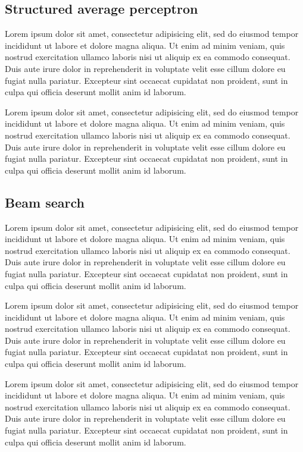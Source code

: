 \documentclass[11pt,letterpaper]{article}
\begin{document}
\subsection{Structured average perceptron}

Lorem ipsum dolor sit amet, consectetur adipisicing elit, sed do eiusmod tempor incididunt ut labore et dolore magna aliqua. Ut enim ad minim veniam, quis nostrud exercitation ullamco laboris nisi ut aliquip ex ea commodo consequat. Duis aute irure dolor in reprehenderit in voluptate velit esse cillum dolore eu fugiat nulla pariatur. Excepteur sint occaecat cupidatat non proident, sunt in culpa qui officia deserunt mollit anim id laborum.


Lorem ipsum dolor sit amet, consectetur adipisicing elit, sed do eiusmod tempor incididunt ut labore et dolore magna aliqua. Ut enim ad minim veniam, quis nostrud exercitation ullamco laboris nisi ut aliquip ex ea commodo consequat. Duis aute irure dolor in reprehenderit in voluptate velit esse cillum dolore eu fugiat nulla pariatur. Excepteur sint occaecat cupidatat non proident, sunt in culpa qui officia deserunt mollit anim id laborum.

\subsection{Beam search}

Lorem ipsum dolor sit amet, consectetur adipisicing elit, sed do eiusmod tempor incididunt ut labore et dolore magna aliqua. Ut enim ad minim veniam, quis nostrud exercitation ullamco laboris nisi ut aliquip ex ea commodo consequat. Duis aute irure dolor in reprehenderit in voluptate velit esse cillum dolore eu fugiat nulla pariatur. Excepteur sint occaecat cupidatat non proident, sunt in culpa qui officia deserunt mollit anim id laborum.

Lorem ipsum dolor sit amet, consectetur adipisicing elit, sed do eiusmod tempor incididunt ut labore et dolore magna aliqua. Ut enim ad minim veniam, quis nostrud exercitation ullamco laboris nisi ut aliquip ex ea commodo consequat. Duis aute irure dolor in reprehenderit in voluptate velit esse cillum dolore eu fugiat nulla pariatur. Excepteur sint occaecat cupidatat non proident, sunt in culpa qui officia deserunt mollit anim id laborum.

Lorem ipsum dolor sit amet, consectetur adipisicing elit, sed do eiusmod tempor incididunt ut labore et dolore magna aliqua. Ut enim ad minim veniam, quis nostrud exercitation ullamco laboris nisi ut aliquip ex ea commodo consequat. Duis aute irure dolor in reprehenderit in voluptate velit esse cillum dolore eu fugiat nulla pariatur. Excepteur sint occaecat cupidatat non proident, sunt in culpa qui officia deserunt mollit anim id laborum.
\end{document}
